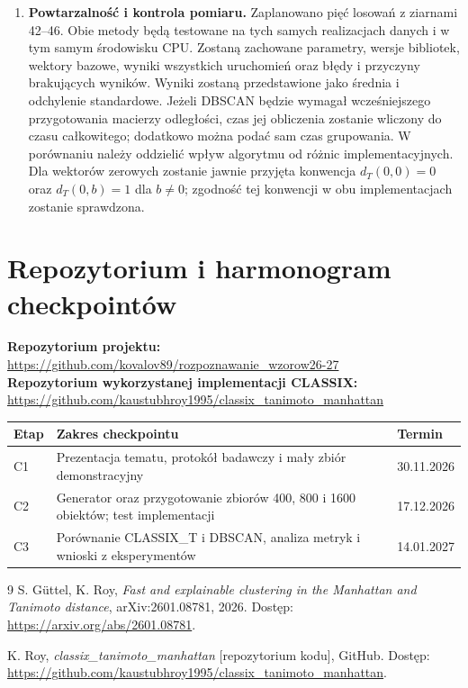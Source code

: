 \documentclass[10pt]{article}
\begin{document}
\begin{singlespace}
\begin{enumerate}
  \item \textbf{Powtarzalność i kontrola pomiaru.} Zaplanowano pięć losowań z ziarnami 42--46. Obie metody będą testowane na tych samych realizacjach danych i w tym samym środowisku CPU. Zostaną zachowane parametry, wersje bibliotek, wektory bazowe, wyniki wszystkich uruchomień oraz błędy i przyczyny brakujących wyników. Wyniki zostaną przedstawione jako średnia i odchylenie standardowe. Jeżeli DBSCAN będzie wymagał wcześniejszego przygotowania macierzy odległości, czas jej obliczenia zostanie wliczony do czasu całkowitego; dodatkowo można podać sam czas grupowania. W porównaniu należy oddzielić wpływ algorytmu od różnic implementacyjnych. Dla wektorów zerowych zostanie jawnie przyjęta konwencja $d_T(0,0)=0$ oraz $d_T(0,b)=1$ dla $b\ne0$; zgodność tej konwencji w obu implementacjach zostanie sprawdzona.
\end{enumerate}
\end{singlespace}

\pagebreak
\section{Repozytorium i harmonogram checkpointów}
\begin{singlespace}
\textbf{Repozytorium projektu:}\\
\url{https://github.com/kovalov89/rozpoznawanie_wzorow26-27}\\[3pt]
\textbf{Repozytorium wykorzystanej implementacji CLASSIX:}\\
\url{https://github.com/kaustubhroy1995/classix_tanimoto_manhattan}

\begin{center}
\begin{tabular}{p{}p{}p{}}
\toprule
\textbf{Etap} & \textbf{Zakres checkpointu} & \textbf{Termin} \\
\midrule
C1 & Prezentacja tematu, protokół badawczy i mały zbiór demonstracyjny & 30.11.2026 \\
C2 & Generator oraz przygotowanie zbiorów 400, 800 i 1600 obiektów; test implementacji & 17.12.2026 \\
C3 & Porównanie CLASSIX\_T i DBSCAN, analiza metryk i wnioski z eksperymentów & 14.01.2027 \\
\bottomrule
\end{tabular}
\end{center}
\end{singlespace}

\begin{thebibliography}{9}
S. Güttel, K. Roy, \emph{Fast and explainable clustering in the Manhattan and Tanimoto distance}, arXiv:2601.08781, 2026. Dostęp: \url{https://arxiv.org/abs/2601.08781}.

K. Roy, \emph{classix\_tanimoto\_manhattan} [repozytorium kodu], GitHub. Dostęp: \url{https://github.com/kaustubhroy1995/classix_tanimoto_manhattan}.
\end{thebibliography}
\end{document}
